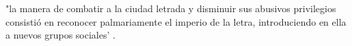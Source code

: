 "la manera de combatir a la ciudad letrada y disminuir sus abusivos privilegios consistió en reconocer palmariamente el imperio de la letra, introduciendo en ella a nuevos grupos sociales' \cite[72]{Rama2002}.